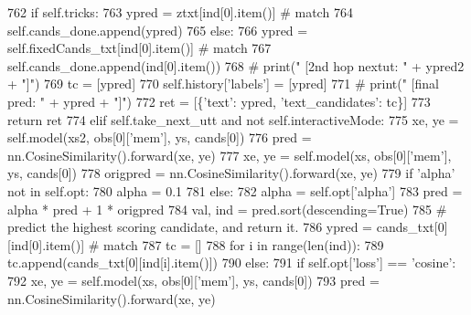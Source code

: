 \begin{DoxyCode}
762                     \textcolor{keywordflow}{if} self.tricks:
763                         ypred = ztxt[ind[0].item()]  \textcolor{comment}{# match}
764                         self.cands\_done.append(ypred)
765                     \textcolor{keywordflow}{else}:
766                         ypred = self.fixedCands\_txt[ind[0].item()]  \textcolor{comment}{# match}
767                         self.cands\_done.append(ind[0].item())
768                         \textcolor{comment}{# print("   [2nd hop nextut: " + ypred2 + "]")}
769                     tc = [ypred]
770                     self.history[\textcolor{stringliteral}{'labels'}] = [ypred]
771                     \textcolor{comment}{# print("   [final pred: " + ypred + "]")}
772                     ret = [\{\textcolor{stringliteral}{'text'}: ypred, \textcolor{stringliteral}{'text\_candidates'}: tc\}]
773                     \textcolor{keywordflow}{return} ret
774                 \textcolor{keywordflow}{elif} self.take\_next\_utt \textcolor{keywordflow}{and} \textcolor{keywordflow}{not} self.interactiveMode:
775                     xe, ye = self.model(xs2, obs[0][\textcolor{stringliteral}{'mem'}], ys, cands[0])
776                     pred = nn.CosineSimilarity().forward(xe, ye)
777                     xe, ye = self.model(xs, obs[0][\textcolor{stringliteral}{'mem'}], ys, cands[0])
778                     origpred = nn.CosineSimilarity().forward(xe, ye)
779                     \textcolor{keywordflow}{if} \textcolor{stringliteral}{'alpha'} \textcolor{keywordflow}{not} \textcolor{keywordflow}{in} self.opt:
780                         alpha = 0.1
781                     \textcolor{keywordflow}{else}:
782                         alpha = self.opt[\textcolor{stringliteral}{'alpha'}]
783                     pred = alpha * pred + 1 * origpred
784                     val, ind = pred.sort(descending=\textcolor{keyword}{True})
785                     \textcolor{comment}{# predict the highest scoring candidate, and return it.}
786                     ypred = cands\_txt[0][ind[0].item()]  \textcolor{comment}{# match}
787                     tc = []
788                     \textcolor{keywordflow}{for} i \textcolor{keywordflow}{in} range(len(ind)):
789                         tc.append(cands\_txt[0][ind[i].item()])
790             \textcolor{keywordflow}{else}:
791                 \textcolor{keywordflow}{if} self.opt[\textcolor{stringliteral}{'loss'}] == \textcolor{stringliteral}{'cosine'}:
792                     xe, ye = self.model(xs, obs[0][\textcolor{stringliteral}{'mem'}], ys, cands[0])
793                     pred = nn.CosineSimilarity().forward(xe, ye)

\end{DoxyCode}

